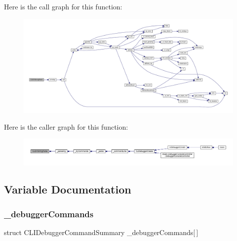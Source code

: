 Here is the call graph for this function\+:
\nopagebreak
\begin{figure}[H]
\begin{center}
\leavevmode
\includegraphics[width=350pt]{debugger_2cli-debugger_8c_a98d7c3768ef0af611a57d21782b34ca1_cgraph}
\end{center}
\end{figure}
Here is the caller graph for this function\+:
\nopagebreak
\begin{figure}[H]
\begin{center}
\leavevmode
\includegraphics[width=350pt]{debugger_2cli-debugger_8c_a98d7c3768ef0af611a57d21782b34ca1_icgraph}
\end{center}
\end{figure}


\subsection{Variable Documentation}
\mbox{\label{debugger_2cli-debugger_8c_a3c6f5f79f16164bd29e68ea0d7ddab2a}} 
\subsubsection{\texorpdfstring{\+\_\+debugger\+Commands}{\_debuggerCommands}}
{\footnotesize\ttfamily struct C\+L\+I\+Debugger\+Command\+Summary \+\_\+debugger\+Commands\mbox{[}$\,$\mbox{]}\hspace{0.3cm}{\ttfamily [static]}}

